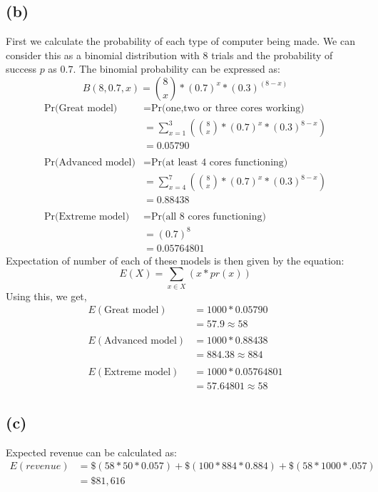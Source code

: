 \documentclass[11pt]{article}
\begin{document}
\subsection*{(b)}
First we calculate the probability of each type of computer being made. We can consider this as a binomial distribution with 8 trials and the probability of success $p$ as $0.7$. The binomial probability can be expressed as:
\begin{equation*}
B(8,0.7,x) = \binom{8}{x}*(0.7)^x * (0.3)^{(8-x)}
\end{equation*}
\begin{equation*}
\begin{split}
\text{Pr(Great model)} &= \text{Pr(one,two or three cores working)}\\
&=\sum_{x=1}^3\left(\binom{8}{x}*(0.7)^x * (0.3)^{8-x}\right)\\
&=0.05790\\ \\
\text{Pr(Advanced model)} &= \text{Pr(at least 4 cores functioning)}\\
&=\sum_{x=4}^7\left(\binom{8}{x}*(0.7)^x * (0.3)^{8-x}\right)\\
&= 0.88438\\ \\
\text{Pr(Extreme model)} &= \text{Pr(all 8 cores functioning)}\\
&= (0.7)^8\\
&=0.05764801
\end{split}
\end{equation*}
Expectation of number of each of these models is then given by the equation:
\begin{equation*}
E(X) = \sum_{x\in X} \left(x*pr(x)\right)
\end{equation*}
Using this, we get,
\begin{equation*}
\begin{split}
E(\text{Great model}) &= 1000*0.05790\\
&=57.9 \approx 58\\ \\
E(\text{Advanced model}) &= 1000*0.88438\\
&=884.38 \approx 884\\ \\
E(\text{Extreme model}) &= 1000*0.05764801\\
&=57.64801 \approx 58
\end{split}
\end{equation*}
\subsection*{(c)}
Expected revenue can be calculated as:
\begin{equation*}
\begin{split}
E(revenue) &= \$(58*50*0.057) +\$(100*884*0.884) + \$(58*1000*.057)\\
&=\$81,616
\end{split}
\end{equation*}
\end{document}
